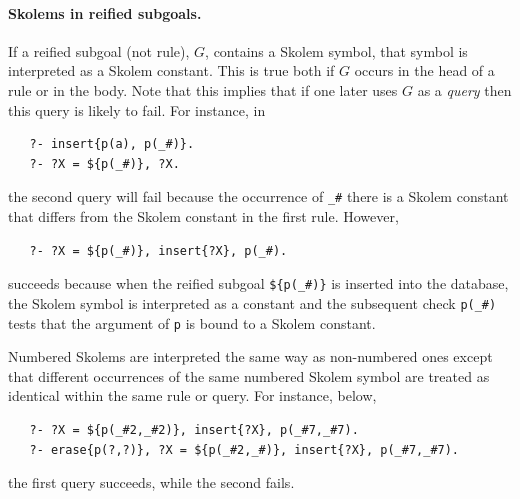 \documentclass[11pt]{article}
\begin{document}
\paragraph{Skolems in reified subgoals.}
If a reified subgoal (not rule), $G$, contains a Skolem symbol, that symbol is
interpreted as a Skolem constant. This is true both if $G$ occurs in the head
of a rule or in the body.
Note that this implies that if one later uses $G$ as a \emph{query} then
this query is likely to fail. For instance, in
\begin{verbatim}
   ?- insert{p(a), p(_#)}.
   ?- ?X = ${p(_#)}, ?X.
\end{verbatim}
the second query will fail because the occurrence of \verb|_#| there is a
Skolem constant that differs from the Skolem constant in the first rule.
However,
\begin{verbatim}
   ?- ?X = ${p(_#)}, insert{?X}, p(_#).
\end{verbatim}
succeeds because when the reified subgoal \verb|${p(_#)}| is inserted into the
database, the Skolem symbol is interpreted as a constant and the subsequent
check \verb|p(_#)| tests that the argument of \texttt{p} is bound to a
Skolem constant. 

Numbered Skolems are interpreted the same way as non-numbered ones except
that different occurrences of the same numbered Skolem symbol are treated
as identical within the same rule or query.
For instance, below,
\begin{verbatim}
   ?- ?X = ${p(_#2,_#2)}, insert{?X}, p(_#7,_#7).
   ?- erase{p(?,?)}, ?X = ${p(_#2,_#)}, insert{?X}, p(_#7,_#7).
\end{verbatim}
the first query succeeds, while the second fails.
\end{document}
